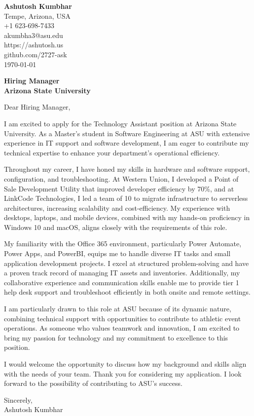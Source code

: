 \documentclass[11pt]{article}
\begin{document}
\begin{flushleft}
\textbf{Ashutosh Kumbhar} \\
Tempe, Arizona, USA \\
+1 623-698-7433 \\
akumbha3@asu.edu \\
https://ashutosh.us \\
github.com/2727-ask \\
\today
\end{flushleft}

\vspace{0.5em}

\textbf{Hiring Manager} \\
\textbf{Arizona State University} \\

\vspace{1em}

Dear Hiring Manager,

I am excited to apply for the Technology Assistant position at Arizona State University. As a Master’s student in Software Engineering at ASU with extensive experience in IT support and software development, I am eager to contribute my technical expertise to enhance your department’s operational efficiency.

Throughout my career, I have honed my skills in hardware and software support, configuration, and troubleshooting. At Western Union, I developed a Point of Sale Development Utility that improved developer efficiency by 70\%, and at LinkCode Technologies, I led a team of 10 to migrate infrastructure to serverless architectures, increasing scalability and cost-efficiency. My experience with desktops, laptops, and mobile devices, combined with my hands-on proficiency in Windows 10 and macOS, aligns closely with the requirements of this role.

My familiarity with the Office 365 environment, particularly Power Automate, Power Apps, and PowerBI, equips me to handle diverse IT tasks and small application development projects. I excel at structured problem-solving and have a proven track record of managing IT assets and inventories. Additionally, my collaborative experience and communication skills enable me to provide tier 1 help desk support and troubleshoot efficiently in both onsite and remote settings.

I am particularly drawn to this role at ASU because of its dynamic nature, combining technical support with opportunities to contribute to athletic event operations. As someone who values teamwork and innovation, I am excited to bring my passion for technology and my commitment to excellence to this position.

I would welcome the opportunity to discuss how my background and skills align with the needs of your team. Thank you for considering my application. I look forward to the possibility of contributing to ASU’s success.

Sincerely, \\
Ashutosh Kumbhar
\end{document}
